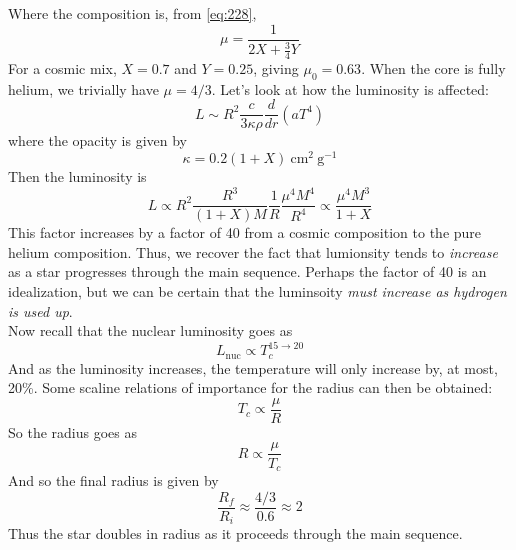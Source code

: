 \documentclass[10pt]{article}
\numberwithin{equation}{section}
\newcommand{\n}{\noindent}
\begin{document}
    Where the composition is, from \eqref{eq:228},
    \begin{equation}
      \label{eq:230}
      \mu = \frac{1}{2X+\frac{3}{4}Y}
    \end{equation}
    For a cosmic mix, $X=0.7$ and $Y=0.25$, giving $\mu_0=0.63$. When
    the core is fully helium, we trivially have $\mu=4/3$. Let's look
    at how the luminosity is affected:
    \begin{equation}
      \label{eq:231}
      L\sim R^2\frac{c}{3\kappa\rho}\frac{d}{dr}\left(aT^4\right)
    \end{equation}
    where the opacity is given by
    \begin{equation}
      \label{eq:232}
      \kappa = 0.2(1+X)\ \mathrm{cm^2\ g^{-1}}
    \end{equation}
    Then the luminosity is
    \begin{equation}
      \label{eq:233}
      L\propto R^2\frac{R^3}{(1+X)M}\frac{1}{R}\frac{\mu^4M^4}{R^4}\propto
\frac{\mu^4M^3}{1+X}
    \end{equation}
    This factor increases by a factor of 40 from a cosmic composition
    to the pure helium composition. Thus, we recover the fact that
    lumionsity tends to \emph{increase} as a star progresses through
    the main sequence. Perhaps the factor of 40 is an idealization,
    but we can be certain that the luminsoity \emph{must increase as
      hydrogen is used up}.\\

    \n Now recall that the nuclear luminosity goes as
    \begin{equation}
      \label{eq:235}
      L_{\mathrm{nuc}}\propto T_c^{15\to 20}
    \end{equation}
    And as the luminosity increases, the temperature will only
    increase by, at most, 20\%. Some scaline relations of importance
    for the radius can then be obtained:
    \begin{equation}
      \label{eq:236}
      T_c\propto\frac{\mu}{R}
    \end{equation}
    So the radius goes as
    \begin{equation}
      \label{eq:237}
      R\propto\frac{\mu}{T_c}
    \end{equation}
    And so the final radius is given by
    \begin{equation}
      \label{eq:238}
      \frac{R_f}{R_i}\approx \frac{4/3}{0.6}\approx 2
    \end{equation}
    Thus the star doubles in radius as it proceeds through the main 
sequence.
\end{document}
